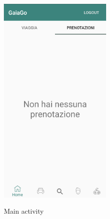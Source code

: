 \begin{figure}[H] 
	\centering 
	\includegraphics[width=0.5\textwidth]{res/images/prenotazioni.png}\\
	\caption{Main activity}
	\label{Login1}
\end{figure}
\pagebreak
